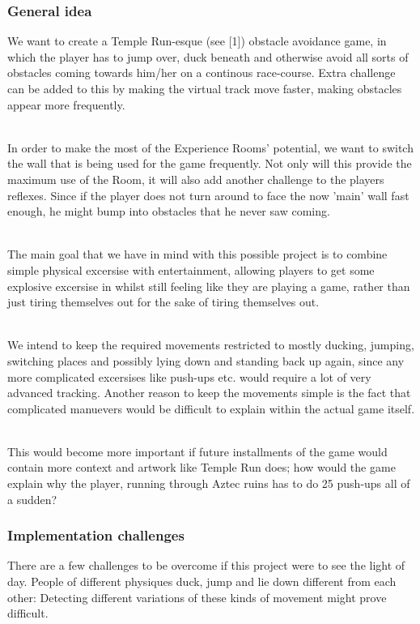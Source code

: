 \documentclass[11pt]{article}
\begin{document}
\subsubsection*{General idea}
We want to create a Temple Run-esque (see [1]) obstacle avoidance game, in which the player has to jump over, duck beneath and otherwise avoid all sorts of obstacles coming towards him/her on a continous race-course. Extra challenge can be added to this by making the virtual track move faster, making obstacles appear more frequently. 

~\\
In order to make the most of the Experience Rooms' potential, we want to switch the wall that is being used for the game frequently. Not only will this provide the maximum use of the Room, it will also add another challenge to the players reflexes. Since if the player does not turn around to face the now 'main' wall fast enough, he might bump into obstacles that he never saw coming.

~\\
The main goal that we have in mind with this possible project is to combine simple physical excersise with entertainment, allowing players to get some explosive excersise in whilst still feeling like they are playing a game, rather than just tiring themselves out for the sake of tiring themselves out.

~\\
We intend to keep the required movements restricted to mostly ducking, jumping, switching places and possibly lying down and standing back up again, since any more complicated excersises like push-ups etc. would require a lot of very advanced tracking. Another reason to keep the movements simple is the fact that complicated manuevers would be difficult to explain within the actual game itself. 

~\\
This would become more important if future installments of the game would contain more context and artwork like Temple Run does; how would the game explain why the player, running through Aztec ruins has to do 25 push-ups all of a sudden?


\newpage
{}
\subsubsection*{Implementation challenges}
There are a few challenges to be overcome if this project were to see the light of day. People of different physiques duck, jump and lie down different from each other: Detecting different variations of these kinds of movement might prove difficult. 
\end{document}
